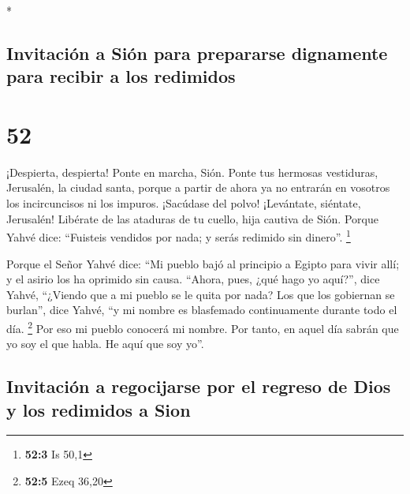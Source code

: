 \begin{paracol}{2}
\begin{otherlanguage}{english}
\end{otherlanguage}

\switchcolumn[0]*

\hypertarget{invitaciuxf3n-a-siuxf3n-para-prepararse-dignamente-para-recibir-a-los-redimidos}{%
\subsection{Invitación a Sión para prepararse dignamente para recibir a
los
redimidos}\label{invitaciuxf3n-a-siuxf3n-para-prepararse-dignamente-para-recibir-a-los-redimidos}}

\hypertarget{section-102}{%
\section{52}\label{section-102}}

 ¡Despierta, despierta! Ponte en marcha, Sión. Ponte tus
hermosas vestiduras, Jerusalén, la ciudad santa, porque a partir de
ahora ya no entrarán en vosotros los incircuncisos ni los impuros.
 ¡Sacúdase del polvo! ¡Levántate, siéntate, Jerusalén!
Libérate de las ataduras de tu cuello, hija cautiva de Sión.
 Porque Yahvé dice: ``Fuisteis vendidos por nada; y serás
redimido sin dinero''. \footnote{\textbf{52:3} Is 50,1}

 Porque el Señor Yahvé dice: ``Mi pueblo bajó al principio
a Egipto para vivir allí; y el asirio los ha oprimido sin causa.
 ``Ahora, pues, ¿qué hago yo aquí?'', dice Yahvé,
``¿Viendo que a mi pueblo se le quita por nada? Los que los gobiernan se
burlan'', dice Yahvé, ``y mi nombre es blasfemado continuamente durante
todo el día. \footnote{\textbf{52:5} Ezeq 36,20}  Por eso
mi pueblo conocerá mi nombre. Por tanto, en aquel día sabrán que yo soy
el que habla. He aquí que soy yo''.

\hypertarget{invitaciuxf3n-a-regocijarse-por-el-regreso-de-dios-y-los-redimidos-a-sion}{%
\subsection{Invitación a regocijarse por el regreso de Dios y los
redimidos a
Sion}\label{invitaciuxf3n-a-regocijarse-por-el-regreso-de-dios-y-los-redimidos-a-sion}}


\end{paracol}
